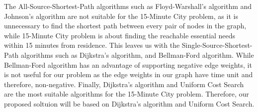 The All-Source-Shortest-Path algorithms such as Floyd-Warshall's algorithm and Johnson's algorithm are not suitable for the 15-Minute City problem, as it is unnecessary to find the shortest path between every pair of nodes in the graph, while 15-Minute City problem is about finding the reachable essential needs within 15 minutes from residence. This leaves us with the Single-Source-Shortest-Path algorithms such as Dijkstra's algorithm, and Bellman-Ford algorithm. While Bellman-Ford algorithm has an advantage of supporting negative edge weights, it is not useful for our problem as the edge weights in our graph have time unit and therefore, non-negative. Finally, Dijkstra's algorithm and Uniform Cost Search are the most suitable algorithms for the 15-Minute City problem. Therefore, our proposed soltuion will be based on Dijkstra's algorithm and Uniform Cost Search.